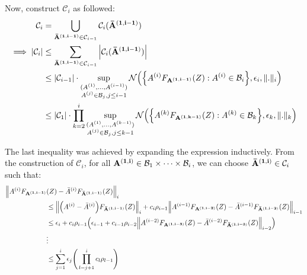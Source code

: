 \begin{proof*}
    \noindent Now, construct $\mathcal{C}_i$ as followed:
    \begin{align*}
        \mathcal{C}_i 
            &= \bigcup_{{\bf {\bar A}^{(1, i-1)}}\in\mathcal{C}_{i-1}} \mathcal{C}_i({\bf {\bar A}^{(1, i-1)}}) \\
        \implies
        |\mathcal{C}_i| 
            &\le \sum_{{\bf {\bar A}^{(1, i-1)}}\in\mathcal{C}_{i-1}} \Big| \mathcal{C}_i({\bf {\bar A}^{(1, i-1)}}) \Big| \\
            &\le |\mathcal{C}_{i-1}| \cdot \sup_{
                \substack{
                    (A^{(1)}, \dots, A^{(i-1)})\\
                    A^{(j)}\in\mathcal{B}_j, j \le i-1
                }
            } \mathcal{N}\Big( 
                \Big\{ 
                    A^{(i)}F_{\bf A^{(1, i-1)}}(Z) : A^{(i)} \in \mathcal{B}_i
                 \Big\}, \epsilon_i, \|.\|_i
             \Big) \\
            &\le |\mathcal{C}_1|\cdot \prod_{k=2}^i \sup_{
                \substack{
                    (A^{(1)}, \dots, A^{(k-1)})\\
                    A^{(j)}\in\mathcal{B}_j, j \le k-1
                }
            } \mathcal{N}\Big( 
                \Big\{ 
                    A^{(k)}F_{\bf A^{(1, k-1)}}(Z) : A^{(k)} \in \mathcal{B}_k
                 \Big\}, \epsilon_k, \|.\|_k
             \Big)
    \end{align*}

    \noindent The last inequality was achieved by expanding the expression inductively. From the construction of $\mathcal{C}_i$, for all ${\bf A^{(1, i)}}\in\mathcal{B}_1\times\dots\times\mathcal{B}_i$, we can choose ${\bf {\bar A}^{(1, i)}}\in\mathcal{C}_i$ such that:
    \begin{align*}
        \Big\|
            A^{(i)}F_{\bf A^{(1, i-1)}}&(Z) - {\bar A}^{(i)}F_{\bf {\bar A}^{(1, i-1)}}(Z)
        \Big\|_i \\
            &\le \Big\|\Big( A^{(i)} - {\bar A}^{(i)} \Big)F_{\bf {\bar A}^{(1, i-1)}}(Z) \Big\|_i 
            + c_i\rho_{i-1}\Big\| A^{(i-1)}F_{\bf A^{(1, i-2)}}(Z) - {\bar A}^{(i-1)}F_{\bf {\bar A}^{(1, i-2)}}(Z) \Big\|_{i-1} \\
            &\le \epsilon_i + c_i\rho_{i-1} \Big( 
                \epsilon_{i-1} + c_{i-1}\rho_{i-2}\Big\| A^{(i-2)}F_{\bf A^{(1, i-3)}}(Z) - {\bar A}^{(i-2)}F_{\bf {\bar A}^{(1, i-3)}}(Z) \Big\|_{i-2}
             \Big) \\
            &\vdots \\
            &\le \sum_{j=1}^i\epsilon_j \Bigg( 
                \prod_{l=j+1}^i c_l\rho_{l-1}
             \Bigg)
    \end{align*} 



\end{proof*}
